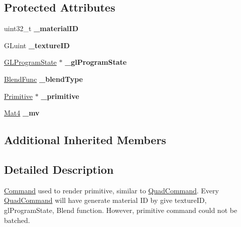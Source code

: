 \subsection*{Protected Attributes}
\begin{DoxyCompactItemize}
\item 
\mbox{\label{classPrimitiveCommand_a9d283e8594c663153ebfed5c55aacd2d}} 
uint32\+\_\+t {\bfseries \+\_\+material\+ID}
\item 
\mbox{\label{classPrimitiveCommand_a51e438b6ffd70a5ad1a7f4be2826036a}} 
G\+Luint {\bfseries \+\_\+texture\+ID}
\item 
\mbox{\label{classPrimitiveCommand_a3922bbfe023a908eecd51b0d48aa3453}} 
\hyperlink{classGLProgramState}{G\+L\+Program\+State} $\ast$ {\bfseries \+\_\+gl\+Program\+State}
\item 
\mbox{\label{classPrimitiveCommand_ad0a2cb665fcbbbbdbdc68a37614b07ff}} 
\hyperlink{structBlendFunc}{Blend\+Func} {\bfseries \+\_\+blend\+Type}
\item 
\mbox{\label{classPrimitiveCommand_a94775d9c712a16ce51d069f606bba68e}} 
\hyperlink{classPrimitive}{Primitive} $\ast$ {\bfseries \+\_\+primitive}
\item 
\mbox{\label{classPrimitiveCommand_ae57fd2b621b5985e612b38cf278238ab}} 
\hyperlink{classMat4}{Mat4} {\bfseries \+\_\+mv}
\end{DoxyCompactItemize}
\subsection*{Additional Inherited Members}


\subsection{Detailed Description}
\hyperlink{classCommand}{Command} used to render primitive, similar to \hyperlink{classQuadCommand}{Quad\+Command}. Every \hyperlink{classQuadCommand}{Quad\+Command} will have generate material ID by give texture\+ID, gl\+Program\+State, Blend function. However, primitive command could not be batched. 

